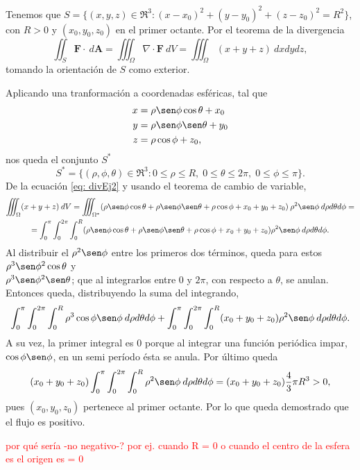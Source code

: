 \begin{solution}
    Tenemos que $S=\{(x,y,z)\in\Re^3:
        (x-x_0)^2+(y-y_0)^2+(z-z_0)^2=R^2\}$, con $R>0$ y
    $(x_0,y_0,z_0)$ en el primer octante.
    Por el teorema de la divergencia
    \begin{equation}
        \iint_S \mathbf{F}\cdot\:d\mathbf{A} = \iiint_\Omega
        \nabla\cdot\mathbf{F}\:dV
        = \iiint_\Omega (x+y+z)\:dxdydz, \label{eq: divEj2}
    \end{equation}
    tomando la orientaci\'on de $S$ como exterior.

    Aplicando una tranformaci\'on a coordenadas esf\'ericas, tal que
    \begin{align*}
        x & =\rho\sen\phi\cos\theta+x_0 \\
        y & =\rho\sen\phi\sen\theta+y_0 \\
        z & =\rho\cos\phi+z_0,
    \end{align*}
    nos queda el conjunto $S^*$
    \[
        S^*=\{(\rho,\phi,\theta)\in\Re^3:0\leq\rho\leq R,\;
        0\leq\theta\leq2\pi,\;0\leq\phi\leq\pi\}.
    \]
    De la ecuaci\'on \eqref{eq: divEj2} y usando el teorema
    de cambio de variable,
    \begin{gather*}
        \iiint_\Omega (x+y+z) \:dV = \iiint_{\Omega^*}
        (\rho\sen\phi\cos\theta + \rho\sen\phi\sen\theta
        + \rho\cos\phi + x_0 + y_0 + z_0)
        \:\rho^2\sen\phi\:d\rho d\theta d\phi=\\
        = \int_0^\pi\int_0^{2\pi}\int_0^R (\rho\sen\phi\cos\theta
        + \rho\sen\phi\sen\theta + \rho\cos\phi
        + x_0 + y_0 + z_0)\rho^2\sen\phi\:d\rho d\theta d\phi.
    \end{gather*}
    Al distribuir el $\rho^2\sen\phi$ entre los primeros dos
    t\'erminos, queda para estos \(\rho^3\sen\phi^2\cos\theta\) y \\
    \(\rho^3\sen\phi^2\sen\theta\); que al integrarlos entre 0
    y $2\pi$, con respecto a $\theta$, se anulan. Entonces queda,
    distribuyendo la suma del integrando,
    \[
        \int_0^\pi\int_0^{2\pi}\int_0^R \rho^3\cos\phi\sen\phi\:
        d\rho d\theta d\phi + \int_0^\pi\int_0^{2\pi}\int_0^R
        (x_0 + y_0 + z_0)\rho^2\sen\phi\:d\rho d\theta d\phi.
    \]
    A su vez, la primer integral es 0 porque al integrar una
    funci\'on peri\'odica impar, $\cos\phi\sen\phi$, en un
    semi per\'iodo \'esta se anula. Por \'ultimo queda
    \[
        (x_0 + y_0 + z_0)\int_0^\pi\int_0^{2\pi}\int_0^R
        \rho^2\sen\phi\:d\rho d\theta d\phi = (x_0 + y_0 + z_0)
        \frac{4}{3}\pi R^3 > 0,
    \]
    pues $(x_0, y_0, z_0)$ pertenece al primer octante.
    Por lo que queda demostrado que el flujo es positivo.

    \textcolor{red}{por qu\'e ser\'ia -no negativo-? por ej. 
    cuando R = 0 o cuando el centro de la esfera es el origen es = 0}
\end{solution}

